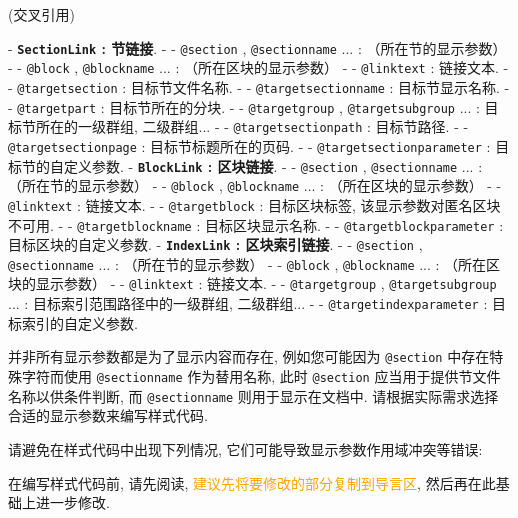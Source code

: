 (\large 交叉引用){
    \par\medskip{}
    - \textbf{\texttt{SectionLink} : 节链接}.
        - - \texttt{@section} , \texttt{@sectionname} ... : （所在节的显示参数）
        - - \texttt{@block} , \texttt{@blockname} ... : （所在区块的显示参数）
        - - \texttt{@linktext} : 链接文本.
        - - \texttt{@targetsection} : 目标节文件名称.
        - - \texttt{@targetsectionname} : 目标节显示名称.
        - - \texttt{@targetpart} : 目标节所在的分块.
        - - \texttt{@targetgroup} , \texttt{@targetsubgroup} ... : 目标节所在的一级群组, 二级群组...
        - - \texttt{@targetsectionpath} : 目标节路径.
        - - \texttt{@targetsectionpage} : 目标节标题所在的页码.
        - - \texttt{@targetsectionparameter} : 目标节的自定义参数.
    \newpage{}
    - \textbf{\texttt{BlockLink} : 区块链接}.
        - - \texttt{@section} , \texttt{@sectionname} ... : （所在节的显示参数）
        - - \texttt{@block} , \texttt{@blockname} ... : （所在区块的显示参数）
        - - \texttt{@linktext} : 链接文本.
        - - \texttt{@targetblock} : 目标区块标签, 该显示参数对匿名区块不可用.
        - - \texttt{@targetblockname} : 目标区块显示名称.
        - - \texttt{@targetblockparameter} : 目标区块的自定义参数.
    - \textbf{\texttt{IndexLink} : 区块索引链接}.
        - - \texttt{@section} , \texttt{@sectionname} ... : （所在节的显示参数）
        - - \texttt{@block} , \texttt{@blockname} ... : （所在区块的显示参数）
        - - \texttt{@linktext} : 链接文本.
        - - \texttt{@targetgroup} , \texttt{@targetsubgroup} ... : 目标索引范围路径中的一级群组, 二级群组...
        - - \texttt{@targetindexparameter} : 目标索引的自定义参数.
}

并非所有显示参数都是为了显示内容而存在, 例如您可能因为 \texttt{@section} 中存在特殊字符而使用 \texttt{@sectionname} 作为替用名称, 此时 \texttt{@section} 应当用于提供节文件名称以供条件判断, 而 \texttt{@sectionname} 则用于显示在文档中. 请根据实际需求选择合适的显示参数来编写样式代码.

请避免在样式代码中出现下列情况, 它们可能导致显示参数作用域冲突等错误:


在编写样式代码前, 请先阅读, \textcolor{orange}{建议先将要修改的部分复制到导言区}, 然后再在此基础上进一步修改.

\newpage
